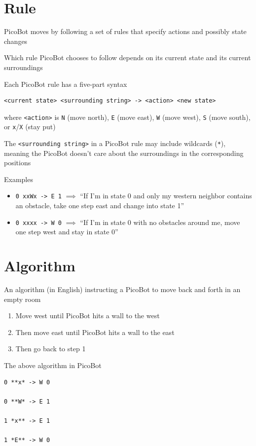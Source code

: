 \documentclass[8pt,a4paper,compress]{beamer}
\begin{document}
\section{Rule}
\begin{frame}[fragile]

PicoBot moves by following a set of rules that specify actions and possibly state changes

\bigskip

Which rule PicoBot chooses to follow depends on its current state and its current surroundings

\bigskip
Each PicoBot rule has a five-part syntax
\begin{lstlisting}[language={}]
<current state> <surrounding string> -> <action> <new state>
\end{lstlisting}
where \lstinline{<action>} is \lstinline{N} (move north), \lstinline{E} (move east), \lstinline{W} (move west), \lstinline{S} (move south), or \lstinline{x}/\lstinline{X} (stay put)

\bigskip

The \lstinline{<surrounding string>} in a PicoBot rule may include wildcards (\lstinline{*}), meaning the PicoBot doesn't care about the surroundings in the corresponding positions

\bigskip

Examples
\begin{itemize}
\item \lstinline{0 xxWx -> E 1} $\implies$ ``If I'm in state 0 and only my western neighbor contains an obstacle, take one step east and change into state 1''

\item \lstinline{0 xxxx -> W 0} $\implies$ ``If I'm in state 0 with no obstacles around me, move one step west and stay in state 0''
\end{itemize}
\end{frame}

\section{Algorithm}
\begin{frame}[fragile]

An algorithm (in English) instructing a PicoBot to move back and forth in an empty room
\begin{enumerate}
\item Move west until PicoBot hits a wall to the west

\item Then move east until PicoBot hits a wall to the east

\item Then go back to step 1
\end{enumerate}


\bigskip

The above algorithm in PicoBot
\begin{lstlisting}[language={}]
0 **x* -> W 0

0 **W* -> E 1

1 *x** -> E 1

1 *E** -> W 0
\end{lstlisting}
\end{frame}
\end{document}

